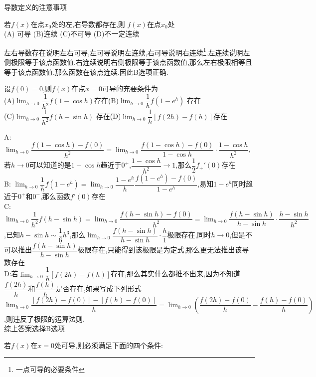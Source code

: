\documentclass[8pt a4paper, oneside, UTF8]{ctexbook}  %
\begin{document}
\begin{sloppypar}
\begin{criterion}{导数定义的注意事项}{}
    \end{criterion}
    \begin{problem}
        若$f(x)$在点$x_{0}$处的左,右导数都存在,则 $f(x)$在点$x_{0}$处\\
        (A) 可导 \quad (B)连续 \quad  (C)不可导 \quad (D)不一定连续
    \end{problem}
    \begin{solution}
        左右导数存在说明左右可导,左可导说明左连续,右可导说明右连续\footnote{一点可导的必要条件}.左连续说明左侧极限等于该点函数值,右连续说明右侧极限等于该点函数值,那么左右极限相等且等于该点函数值,那么函数在该点连续.因此B选项正确.
    \end{solution}
    \begin{problem}
        设$f(0)=0$,则$f(x)$在点$x=0$可导的充要条件为\\
        (A)$\lim_{h\to0}\dfrac{1}{h^{2}}f(1-\cos h)$存在\quad(B)$\lim_{h\to0}\dfrac{1}{h}f(1-e^h)$ 存在\\
        (C)$\lim_{h\to0}\dfrac1{h^2}f(h-\sin h)$ 存在\quad(D)$\lim_{h\to0}\dfrac{1}{h}[f(2h)-f(h)]$存在
    \end{problem}
    \begin{solution}
        A: $\lim_{h \to 0}\dfrac{f(1 -\cos h)-f(0)}{h^2}=\lim_{h \to 0}\dfrac{f(1-\cos h)-f(0)}{1-\cos h}\cdot \dfrac{1-\cos h}{h^2}$,若$h \to 0$可以知道的是$1- \cos h$趋近于$0^+$,$\dfrac{1 - \cos h}{h^2} \to 1$,那么$\dfrac{1}{2}f_+'(0)$存在\\
        B: $\lim_{h \to 0}\dfrac{1}{h}f(1-e^h)=\lim_{h \to 0}\dfrac{1-e^h}{h}\dfrac{f(1-e^h)-f(0)}{1-e^h}$,易知$1-e^h$同时趋近于$0^+$和$0^-$,那么函数$f'(0)$存在\\
        C:$\lim_{h \to 0}\dfrac{1}{h^2}f(h- \sin h)=\lim_{h\to 0}\dfrac{f(h-\sin h)-f(0)}{h^2}=\lim_{h \to 0}\dfrac{f(h-\sin h)}{h -\sin h}\cdot \dfrac{h-\sin h}{h^2}$,已知$h -\sin h \sim \dfrac{1}{6}h^3$,那么$\lim_{h \to 0}\dfrac{f(h-\sin h)}{h -\sin h}\cdot \dfrac{h}{1}$极限存在,同时$h \to 0$,但是不可以推出$\dfrac{f(h-\sin h)}{h-\sin h}$极限存在,只能得到该极限是为定式,那么更无法推出该导数存在\\
        D:若$\lim_{h \to 0}\dfrac{1}{h}[f(2h)-f(h)]$存在,那么其实什么都推不出来,因为不知道$\dfrac{f(2h)}{h}$和$\dfrac{f(h)}{h}$是否存在,如果写成下列形式$\lim_{h \to 0}\dfrac{[f(2h)-f(0)]-[f(h)-f(0)]}{h}=\lim_{h \to 0}\left(\dfrac{f(2h)-f(0)}{h}-\dfrac{f(h)-f(0)}{h}\right)$,则违反了极限的运算法则.\\
        综上答案选择B选项
    \end{solution}
    \begin{conclusion}{若$f(x)$在$x=0$处可导,则必须满足下面的四个条件:}{}

\end{conclusion}
\end{sloppypar}
\end{document}
